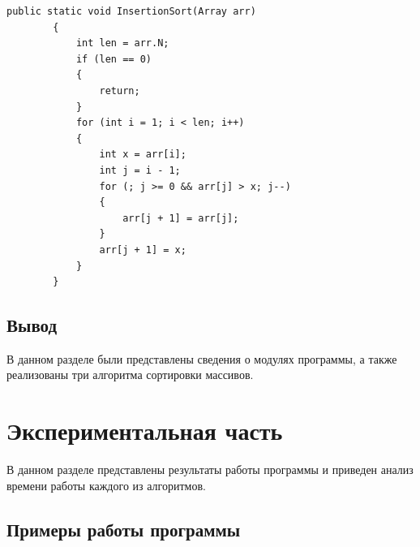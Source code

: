 \documentclass[12pt]{report}
\begin{document}
	\begin{lstlisting}[label=InsertionSort,caption=Алгоритм сортировки вставками]
		public static void InsertionSort(Array arr)
        {
            int len = arr.N;
            if (len == 0)
            {
                return;
            }
            for (int i = 1; i < len; i++)
            {
                int x = arr[i];
                int j = i - 1;
                for (; j >= 0 && arr[j] > x; j--)
                {
                    arr[j + 1] = arr[j];
                }
                arr[j + 1] = x;
            }
        }
	\end{lstlisting}

	\section{Вывод}
	В данном разделе были представлены сведения о модулях программы, а также реализованы три алгоритма сортировки массивов.

	\chapter{Экспериментальная часть}
	В данном разделе представлены результаты работы программы и приведен анализ времени работы каждого из алгоритмов.
	
	\section{Примеры работы программы}
\end{document}

